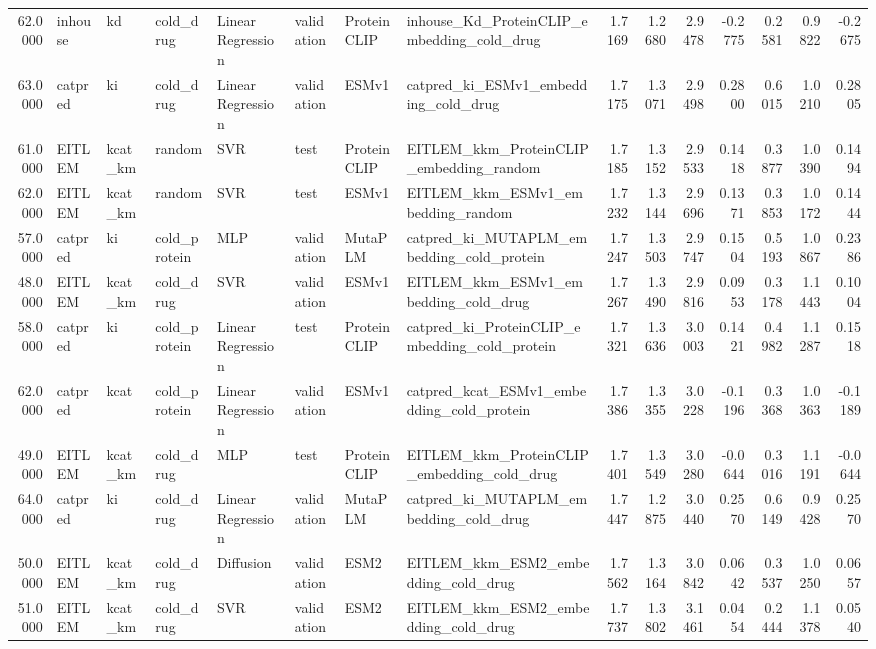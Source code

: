 \begin{tabular}{rlllllllrrrrrrr}
62.0000 & inhouse & kd & cold_drug & Linear Regression & validation & ProteinCLIP & inhouse_Kd_ProteinCLIP_embedding_cold_drug & 1.7169 & 1.2680 & 2.9478 & -0.2775 & 0.2581 & 0.9822 & -0.2675 \\
63.0000 & catpred & ki & cold_drug & Linear Regression & validation & ESMv1 & catpred_ki_ESMv1_embedding_cold_drug & 1.7175 & 1.3071 & 2.9498 & 0.2800 & 0.6015 & 1.0210 & 0.2805 \\
61.0000 & EITLEM & kcat_km & random & SVR & test & ProteinCLIP & EITLEM_kkm_ProteinCLIP_embedding_random & 1.7185 & 1.3152 & 2.9533 & 0.1418 & 0.3877 & 1.0390 & 0.1494 \\
62.0000 & EITLEM & kcat_km & random & SVR & test & ESMv1 & EITLEM_kkm_ESMv1_embedding_random & 1.7232 & 1.3144 & 2.9696 & 0.1371 & 0.3853 & 1.0172 & 0.1444 \\
57.0000 & catpred & ki & cold_protein & MLP & validation & MutaPLM & catpred_ki_MUTAPLM_embedding_cold_protein & 1.7247 & 1.3503 & 2.9747 & 0.1504 & 0.5193 & 1.0867 & 0.2386 \\
48.0000 & EITLEM & kcat_km & cold_drug & SVR & validation & ESMv1 & EITLEM_kkm_ESMv1_embedding_cold_drug & 1.7267 & 1.3490 & 2.9816 & 0.0953 & 0.3178 & 1.1443 & 0.1004 \\
58.0000 & catpred & ki & cold_protein & Linear Regression & test & ProteinCLIP & catpred_ki_ProteinCLIP_embedding_cold_protein & 1.7321 & 1.3636 & 3.0003 & 0.1421 & 0.4982 & 1.1287 & 0.1518 \\
62.0000 & catpred & kcat & cold_protein & Linear Regression & validation & ESMv1 & catpred_kcat_ESMv1_embedding_cold_protein & 1.7386 & 1.3355 & 3.0228 & -0.1196 & 0.3368 & 1.0363 & -0.1189 \\
49.0000 & EITLEM & kcat_km & cold_drug & MLP & test & ProteinCLIP & EITLEM_kkm_ProteinCLIP_embedding_cold_drug & 1.7401 & 1.3549 & 3.0280 & -0.0644 & 0.3016 & 1.1191 & -0.0644 \\
64.0000 & catpred & ki & cold_drug & Linear Regression & validation & MutaPLM & catpred_ki_MUTAPLM_embedding_cold_drug & 1.7447 & 1.2875 & 3.0440 & 0.2570 & 0.6149 & 0.9428 & 0.2570 \\
50.0000 & EITLEM & kcat_km & cold_drug & Diffusion & validation & ESM2 & EITLEM_kkm_ESM2_embedding_cold_drug & 1.7562 & 1.3164 & 3.0842 & 0.0642 & 0.3537 & 1.0250 & 0.0657 \\
51.0000 & EITLEM & kcat_km & cold_drug & SVR & validation & ESM2 & EITLEM_kkm_ESM2_embedding_cold_drug & 1.7737 & 1.3802 & 3.1461 & 0.0454 & 0.2444 & 1.1378 & 0.0540 \\

\end{tabular}
